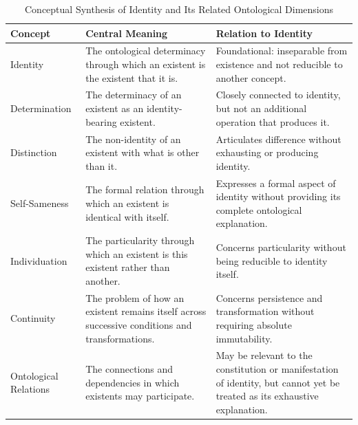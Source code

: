 
\begin{table}[htbp]
\centering
\small
\caption{Conceptual Synthesis of Identity and Its Related Ontological Dimensions}
\label{tab:identity-conceptual-synthesis}

\renewcommand{\arraystretch}{1.5}

\begin{tabular}{
    |p{}
    |p{}
    |p{}|
}
\hline

\textbf{Concept}
&
\textbf{Central Meaning}
&
\textbf{Relation to Identity}
\\
\hline

Identity
&
The ontological determinacy through which an existent is the existent that it is.
&
Foundational: inseparable from existence and not reducible to another concept.
\\
\hline

Determination
&
The determinacy of an existent as an identity-bearing existent.
&
Closely connected to identity, but not an additional operation that produces it.
\\
\hline

Distinction
&
The non-identity of an existent with what is other than it.
&
Articulates difference without exhausting or producing identity.
\\
\hline

Self-Sameness
&
The formal relation through which an existent is identical with itself.
&
Expresses a formal aspect of identity without providing its complete ontological explanation.
\\
\hline

Individuation
&
The particularity through which an existent is this existent rather than another.
&
Concerns particularity without being reducible to identity itself.
\\
\hline

Continuity
&
The problem of how an existent remains itself across successive conditions and transformations.
&
Concerns persistence and transformation without requiring absolute immutability.
\\
\hline

Ontological Relations
&
The connections and dependencies in which existents may participate.
&
May be relevant to the constitution or manifestation of identity, but cannot yet be treated as its exhaustive explanation.
\\
\hline

\end{tabular}

\end{table}

